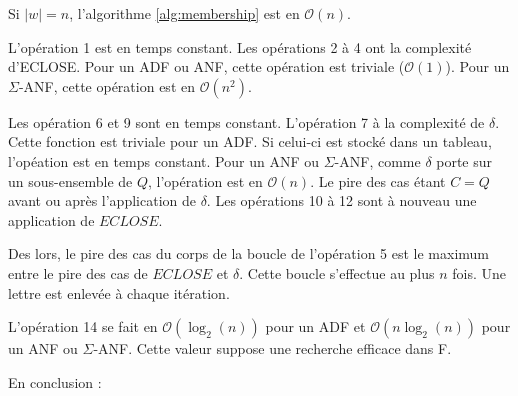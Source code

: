 \begin{complexity}

 Si $|w|=n$, l'algorithme \ref{alg:membership} est en $\mathcal{O}(n)$.

L'opération 1 est en temps constant. Les opérations 2 à 4 ont la complexité d'ECLOSE. Pour un ADF ou ANF, cette opération est triviale ($\mathcal{O}(1)$). Pour un $\Sigma$-ANF, cette opération est en $\mathcal{O}(n^2)$.

Les opération 6 et 9 sont en temps constant. L'opération 7 à la complexité de $\delta$. Cette fonction est triviale pour un ADF. Si celui-ci est stocké dans un tableau, l'opéation est en temps constant. Pour un ANF ou $\Sigma$-ANF, comme $\delta$ porte sur un sous-ensemble de $Q$, l'opération est en $\mathcal{O}(n)$. Le pire des cas étant $C=Q$ avant ou après l'application de $\delta$. Les opérations 10 à 12 sont à nouveau une application de $ECLOSE$.

Des lors, le pire des cas du corps de la boucle de l'opération 5 est le maximum entre le pire des cas de $ECLOSE$ et $\delta$. Cette boucle s'effectue au plus $n$ fois. Une lettre est enlevée à chaque itération.

L'opération 14 se fait en $\mathcal{O}(\log_2(n))$ pour un ADF et $\mathcal{O}(n\log_2(n))$ pour un ANF ou $\Sigma$-ANF. Cette valeur suppose une recherche efficace dans F.

En conclusion :
\begin{table}[H]
  \centering
\end{table}



\end{complexity}





